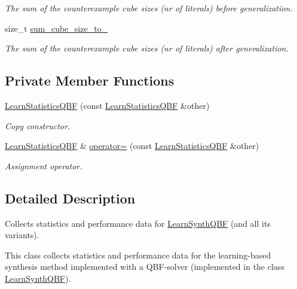 \begin{DoxyCompactItemize}
\begin{DoxyCompactList}\small\item\em The sum of the counterexample cube sizes (nr of literals) before generalization. \end{DoxyCompactList}\item 
size\-\_\-t \hyperlink{classLearnStatisticsQBF_a444ff1c70c90edfd87a56790060c0aae}{sum\-\_\-cube\-\_\-size\-\_\-to\-\_\-}
\begin{DoxyCompactList}\small\item\em The sum of the counterexample cube sizes (nr of literals) after generalization. \end{DoxyCompactList}\end{DoxyCompactItemize}
\subsection*{Private Member Functions}
\begin{DoxyCompactItemize}
\item 
\hyperlink{classLearnStatisticsQBF_a52c8f98a5b32ce587b73f7b6f921298d}{Learn\-Statistics\-Q\-B\-F} (const \hyperlink{classLearnStatisticsQBF}{Learn\-Statistics\-Q\-B\-F} \&other)
\begin{DoxyCompactList}\small\item\em Copy constructor. \end{DoxyCompactList}\item 
\hyperlink{classLearnStatisticsQBF}{Learn\-Statistics\-Q\-B\-F} \& \hyperlink{classLearnStatisticsQBF_ad381a6f0a78d73aaed2d87e00b5d9ea9}{operator=} (const \hyperlink{classLearnStatisticsQBF}{Learn\-Statistics\-Q\-B\-F} \&other)
\begin{DoxyCompactList}\small\item\em Assignment operator. \end{DoxyCompactList}\end{DoxyCompactItemize}


\subsection{Detailed Description}
Collects statistics and performance data for \hyperlink{classLearnSynthQBF}{Learn\-Synth\-Q\-B\-F} (and all its variants). 

This class collects statistics and performance data for the learning-\/based synthesis method implemented with a Q\-B\-F-\/solver (implemented in the class \hyperlink{classLearnSynthQBF}{Learn\-Synth\-Q\-B\-F}).

